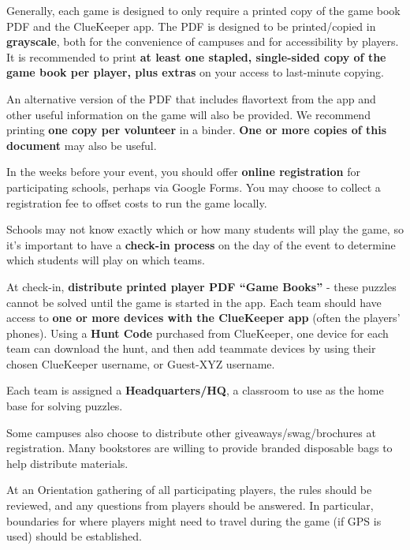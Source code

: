 \newpage


Generally, each game is designed to only require a printed copy
of the game book PDF and the ClueKeeper app.
The PDF is designed to be printed/copied in \textbf{grayscale}, both
for the convenience of campuses and for accessibility by players.
It is recommended to print
\textbf{at least one stapled, single-sided
copy of the game book per player, plus extras}
on your access to last-minute copying.

An alternative version of the PDF that includes flavortext from the
app and other useful information on the game will also be provided.
We recommend printing \textbf{one copy per volunteer} in a binder.
\textbf{One or more copies of this document} may also be useful.


In the weeks before your event, you should offer
\textbf{online registration} for participating schools, perhaps via
Google Forms. You may choose to collect a registration fee to
offset costs to run the game locally.

Schools may not know exactly which or how many students will play
the game, so it's important to have a \textbf{check-in process}
on the day of the event to determine which students will play on which teams.

At check-in, \textbf{distribute printed player PDF ``Game Books''} - these puzzles
cannot be solved until the game is started in the app.
Each team should have access to \textbf{one or more devices with the ClueKeeper
app} (often the players' phones). Using a \textbf{Hunt Code} purchased
from ClueKeeper, one device for each team can download the hunt, and then
add teammate devices by using their chosen ClueKeeper username, or
Guest-XYZ username.

Each team is assigned a \textbf{Headquarters/HQ}, a classroom to use
as the home base for solving puzzles.

Some campuses also choose to distribute other giveaways/swag/brochures
at registration. Many bookstores are willing to provide branded disposable
bags to help distribute materials.


At an Orientation gathering of all participating players,
the rules should be reviewed, and any questions from players
should be answered. In particular, boundaries for where players might
need to travel during the game (if GPS is used) should be established.

